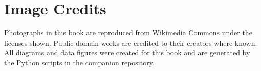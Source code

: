 \chapter*{Image Credits}

Photographs in this book are reproduced from Wikimedia Commons under the licenses shown. Public-domain works are credited to their creators where known. All diagrams and data figures were created for this book and are generated by the Python scripts in the companion repository.

\begingroup\raggedright\sloppy
\expandafter\def\expandafter\UrlBreaks\expandafter{\UrlBreaks\do a\do b\do c\do d\do e\do f\do g\do h\do i\do j\do k\do l\do m\do n\do o\do p\do q\do r\do s\do t\do u\do v\do w\do x\do y\do z\do A\do B\do C\do D\do E\do F\do G\do H\do I\do J\do K\do L\do M\do N\do O\do P\do Q\do R\do S\do T\do U\do V\do W\do X\do Y\do Z\do 0\do 1\do 2\do 3\do 4\do 5\do 6\do 7\do 8\do 9}
